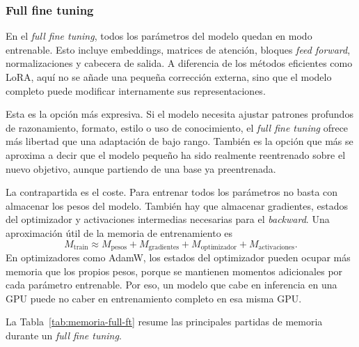 \subsubsection{Full fine tuning}

En el \textit{full fine tuning}, todos los parámetros del modelo quedan en modo entrenable. Esto incluye embeddings, matrices de atención, bloques \textit{feed forward}, normalizaciones y cabecera de salida. A diferencia de los métodos eficientes como LoRA, aquí no se añade una pequeña corrección externa, sino que el modelo completo puede modificar internamente sus representaciones.

Esta es la opción más expresiva. Si el modelo necesita ajustar patrones profundos de razonamiento, formato, estilo o uso de conocimiento, el \textit{full fine tuning} ofrece más libertad que una adaptación de bajo rango. También es la opción que más se aproxima a decir que el modelo pequeño ha sido realmente reentrenado sobre el nuevo objetivo, aunque partiendo de una base ya preentrenada.

La contrapartida es el coste. Para entrenar todos los parámetros no basta con almacenar los pesos del modelo. También hay que almacenar gradientes, estados del optimizador y activaciones intermedias necesarias para el \textit{backward}. Una aproximación útil de la memoria de entrenamiento es
\[
M_{\mathrm{train}}
\approx
M_{\mathrm{pesos}}
+
M_{\mathrm{gradientes}}
+
M_{\mathrm{optimizador}}
+
M_{\mathrm{activaciones}}.
\]
En optimizadores como AdamW, los estados del optimizador pueden ocupar más memoria que los propios pesos, porque se mantienen momentos adicionales por cada parámetro entrenable. Por eso, un modelo que cabe en inferencia en una GPU puede no caber en entrenamiento completo en esa misma GPU.

La Tabla~\ref{tab:memoria-full-ft} resume las principales partidas de memoria durante un \textit{full fine tuning}.


